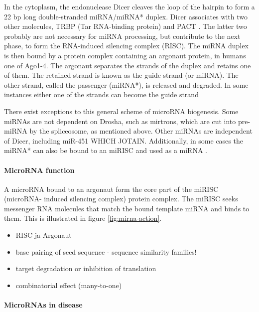 In the cytoplasm, the endonuclease Dicer cleaves the loop of the hairpin to
form a 22 bp long double-stranded miRNA/miRNA* duplex. Dicer associates with
two other molecules, TRBP (Tar RNA-binding protein) and PACT \citep{Tref}. The
latter two probably are not necessary for miRNA processing, but contribute to
the next phase, to form the RNA-induced silencing complex (RISC). The miRNA
duplex is then bound by a protein complex containing an argonaut protein, in
humans one of Ago1-4. The argonaut separates the strands of the duplex and
retains one of them. The retained strand is known as the guide strand (or
miRNA). The other strand, called the passenger (miRNA*), is released and
degraded. In some instances either one of the strands can become the guide strand

There exist exceptions to this general scheme of microRNA biogenesis. Some
miRNAs are not dependent on Drosha, such as mirtrons, which are cut into pre-
miRNA by the spliceosome, as mentioned above. Other miRNAs are independent of
Dicer, including miR-451 WHICH JOTAIN. Additionally, in some cases the miRNA*
can also be bound to an miRISC and used as a miRNA \citep{CITE}.





\paragraph{MicroRNA function}\label{microrna-function}

A microRNA bound to an argonaut form the core part of the miRISC (microRNA-
induced silencing complex) protein complex. The miRISC seeks messenger RNA
molecules that match the bound template miRNA and binds to them. This is illustrated
in figure \ref{fig:mirna-action}.

\begin{itemize}
\item
  RISC ja Argonaut
\item
  base pairing of seed sequence - sequence similarity families!
\item
  target degradation or inhibition of translation
\item
  combinatorial effect (many-to-one)
\end{itemize}





\paragraph{MicroRNAs in disease}\label{micrornas-in-disease}

